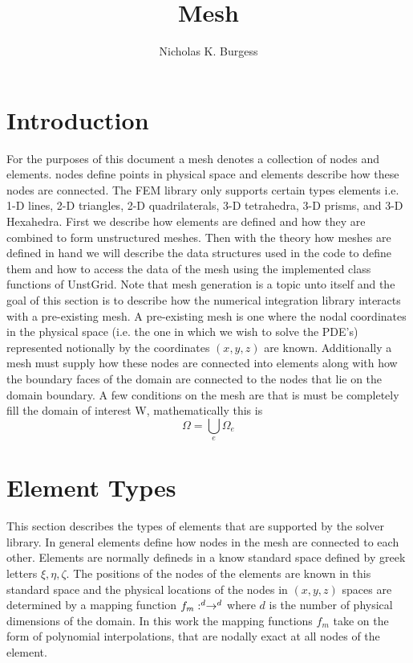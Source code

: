 \documentclass[letterpaper]{article}
\title{Mesh}
\author{Nicholas K. Burgess}
\begin{document}
\maketitle
\section{Introduction} 
For the purposes of this document a mesh denotes a collection of nodes and elements.
nodes define points in physical space and elements describe how these nodes are connected.
The FEM library only supports certain types elements i.e. 1-D lines, 2-D
triangles, 2-D quadrilaterals, 3-D tetrahedra, 3-D prisms, and 3-D Hexahedra. First we
describe how elements are defined and how they are combined to form unstructured
meshes. Then with the theory how meshes are defined in hand we will describe the
data structures used in the code to define them and how to access the data of the mesh
using the implemented class functions of UnstGrid.
Note that mesh generation is a topic unto itself and the goal of this section is to
describe how the numerical integration library interacts with a pre-existing mesh. A
pre-existing mesh is one where the nodal coordinates in the physical space (i.e. the
one in which we wish to solve the PDE’s) represented notionally by the coordinates
$(x,y,z)$ are known. Additionally a mesh must supply how these nodes are connected
into elements along with how the boundary faces of the domain are connected to the
nodes that lie on the domain boundary. A few conditions on the mesh are that is must
be completely fill the domain of interest W, mathematically this is
\begin{equation}
\Omega = \bigcup_{e} \Omega_{e}
\end{equation}  

\section{Element Types}
This section describes the types of elements that are supported by the solver library.  In general elements define how nodes in the mesh are connected to each other.  Elements are normally defineds in a know standard space defined by greek letters $\xi, \eta, \zeta$.  The positions of the nodes of the elements are known in this standard space and the physical locations of the nodes in $(x,y,z)$ spaces are determined by a mapping function $f_{m}: \real^{d}\rightarrow \real^{d} $ where $d$ is the number of physical dimensions of the domain.  In this work the mapping functions $f_{m}$ take on the form of polynomial interpolations, that are nodally exact at all nodes of the element.       
 
\end{document}
